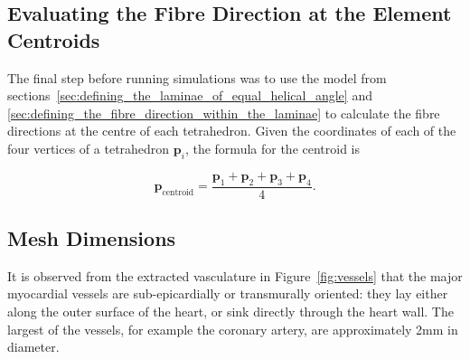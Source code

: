 \subsection{Evaluating the Fibre Direction at the Element Centroids} %
\label{sec:evaluating_the_fibre_direction_at_the_element_centroids}
  The final step before running simulations was to use the model from sections~\ref{sec:defining_the_laminae_of_equal_helical_angle} and \ref{sec:defining_the_fibre_direction_within_the_laminae} to calculate the fibre directions at the centre of each tetrahedron. Given the coordinates of each of the four vertices of a tetrahedron $\mathbf{p}_i$, the formula for the centroid is
  
  \begin{equation}
    \mathbf{p}_{\text{centroid}} = \frac{\mathbf{p}_1+\mathbf{p}_2+\mathbf{p}_3+\mathbf{p}_4}{4} .
  \end{equation}
  
\subsection{Mesh Dimensions} %
\label{sub:mesh_dimensions}
  It is observed from the extracted vasculature in Figure~\ref{fig:vessels} that the major myocardial vessels are sub-epicardially or transmurally oriented: they lay either along the outer surface of the heart, or sink directly through the heart wall. The largest of the vessels, for example the coronary artery, are approximately 2mm in diameter.
  
